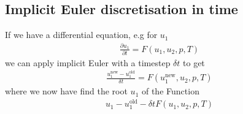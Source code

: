 \documentclass{article}
\begin{document}
 \subsection{Implicit Euler discretisation in time}
If we have a differential equation, e.g for $u_1$
\begin{align*}
	\frac{\partial u_1}{\partial t} = F(u_1,u_2,p,T)
\end{align*}
we can apply implicit Euler with a timestep $\delta t$ to get
\begin{align}
\label{Eulerscheme}
	\frac{u_1^\text{new}-u_1^\text{old}}{\delta t} = F(u_1^\text{new},u_2,p,T)
\end{align}
where we now have find the root $u_1$ of the Function
\begin{align*}
u_1-u_1^\text{old} - \delta tF(u_1,u_2,p,T)
\end{align*}
\end{document}
